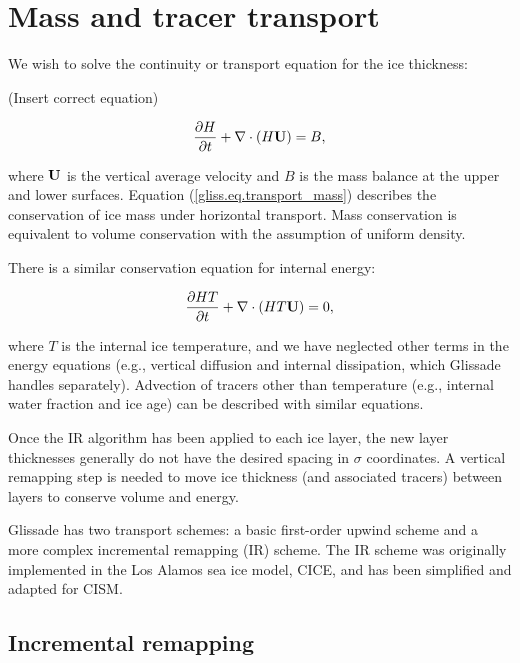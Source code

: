 
\section{Mass and tracer transport}
\label{sc:glissade-transport}

We wish to solve the continuity or transport equation for the ice thickness:

(Insert correct equation)

\begin{equation}
  \label{gliss.eq.transport_mass}
  \frac{\partial H}{\partial t} + \nabla \cdot (H {\bf U}) = B,
\end{equation}

\noindent
where ${\bf U}$ is the vertical average velocity and $B$ is the 
mass balance at the upper and lower surfaces.
Equation (\ref{gliss.eq.transport_mass}) describes the conservation of
ice mass under horizontal transport.  
Mass conservation is equivalent to volume conservation with the assumption
of uniform density.

There is a similar conservation equation for internal energy:

\begin{equation}
  \label{gliss.eq.transport_energy}
  \frac{\partial{H T}}{\partial t} + \nabla \cdot (H T {\bf U}) = 0,
\end{equation}

where $T$ is the internal ice temperature, and we have neglected other terms in the
energy equations (e.g., vertical diffusion and internal dissipation, which Glissade handles
separately).
Advection of tracers other than temperature (e.g., internal water fraction and ice age)
can be described with similar equations.


Once the IR algorithm has been applied to each ice layer, the new layer thicknesses
generally do not have the desired spacing in $\sigma$ coordinates.
A vertical remapping step is needed to move ice thickness (and associated
tracers) between layers to conserve volume and energy.

Glissade has two transport schemes: a basic first-order
upwind scheme and a more complex incremental remapping (IR) scheme.
The IR scheme \citep{Dukowicz2000, Lipscomb2004} 
was originally implemented in the Los Alamos sea ice model, CICE,
and has been simplified and adapted for CISM.  

\subsection{Incremental remapping}
\label{sc:incremental_remapping}

